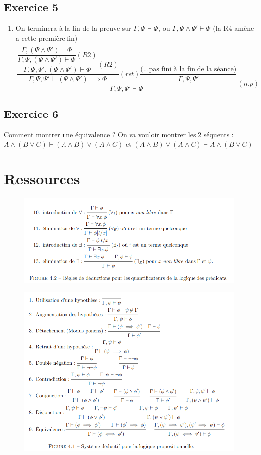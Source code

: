 \documentclass[a4paper]{article}
\begin{document}
    \subsection*{Exercice 5}
    \begin{enumerate}
      \item On terminera à la fin de la preuve sur     $\Gamma,\Phi \vdash \Phi$,     ou     $\Gamma, \Psi \land \Psi ' \vdash \Phi$     (la R4 amène a cette première fin)\\
        $\dfrac{\dfrac{\dfrac{\dfrac{\dfrac{}{\Gamma,(\Psi \land \Psi ')\vdash \Phi}}{\Gamma, \Psi, (\Psi \land \Psi ')\vdash \Phi}(R2)}{\Gamma, \Psi, \Psi ' , (\Psi \land \Psi ')\vdash \Phi}(R2)}{ \Gamma, \Psi, \Psi ' \vdash (\Psi \land \Psi ' )\implies \Phi }(ret) \dfrac{\text{(...pas fini à la fin de la séance)}}{\Gamma, \Psi , \Psi '}}{\Gamma, \Psi, \Psi ' \vdash \Phi}(n.p)$\\
    \end{enumerate}
    \subsection*{Exercice 6}
    Comment montrer une équivalence ?
    On va vouloir montrer les 2 séquents : \\
    $A\land (B\lor C)\vdash (A\land B)\lor (A \land C)$ et $(A\land B)\lor (A\land C) \vdash A\land(B \lor C)$

\section{Ressources}
\begin{figure}[!h]
  \includegraphics[scale = 0.67]{log_prop_quantificateur.png}
\end{figure}
\begin{figure}[!h]
  \includegraphics[scale = 0.67]{logique_propositionnelle.png}
\end{figure}
\end{document}
